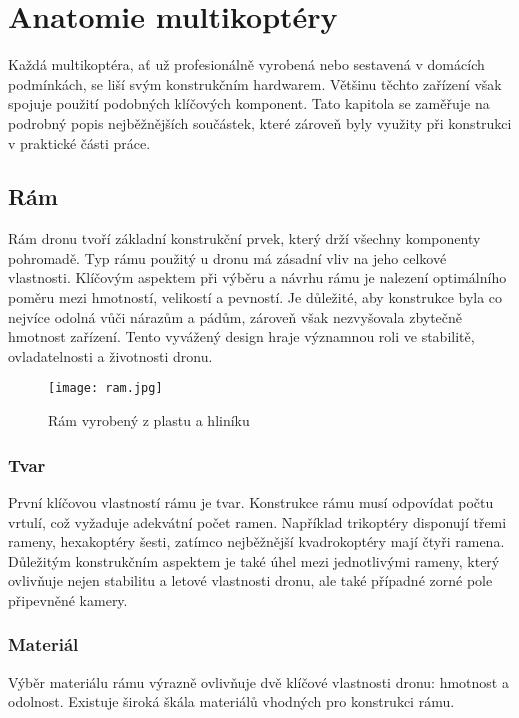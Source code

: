 \documentclass[12pt]{report}
\begin{document}
\chapter[Anatomie multikoptéry]{Anatomie multikoptéry}
Každá multikoptéra, ať už profesionálně vyrobená nebo sestavená v domácích podmínkách, se liší svým konstrukčním hardwarem. Většinu těchto zařízení však spojuje použití podobných klíčových komponent. Tato kapitola se zaměřuje na podrobný popis nejběžnějších součástek, které zároveň byly využity při konstrukci v praktické části práce.

\section[Rám]{Rám}
Rám dronu tvoří základní konstrukční prvek, který drží všechny komponenty pohromadě. Typ rámu použitý u dronu má zásadní vliv na jeho celkové vlastnosti. Klíčovým aspektem při výběru a návrhu rámu je nalezení optimálního poměru mezi hmotností, velikostí a pevností. Je důležité, aby konstrukce byla co nejvíce odolná vůči nárazům a pádům, zároveň však nezvyšovala zbytečně hmotnost zařízení. Tento vyvážený design hraje významnou roli ve stabilitě, ovladatelnosti a životnosti dronu.

\begin{figure}[H]
	\centering
	\texttt{[image: ram.jpg]}
	\caption{Rám vyrobený z plastu a hliníku \cite{mainbook}}
	\label{fig:ram.jpg}
  \end{figure}

\subsection[Tvar]{Tvar}
První klíčovou vlastností rámu je tvar. Konstrukce rámu musí odpovídat počtu vrtulí, což vyžaduje adekvátní počet ramen. Například trikoptéry disponují třemi rameny, hexakoptéry šesti, zatímco nejběžnější kvadrokoptéry mají čtyři ramena. Důležitým konstrukčním aspektem je také úhel mezi jednotlivými rameny, který ovlivňuje nejen stabilitu a letové vlastnosti dronu, ale také případné zorné pole připevněné kamery.

\subsection[Materiál]{Materiál}
Výběr materiálu rámu výrazně ovlivňuje dvě klíčové vlastnosti dronu: hmotnost a odolnost. Existuje široká škála materiálů vhodných pro konstrukci rámu.\\
\end{document}
